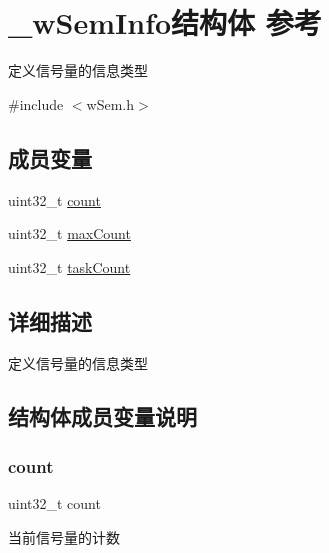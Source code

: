 \hypertarget{struct__w_sem_info}{}\section{\+\_\+w\+Sem\+Info结构体 参考}
\label{struct__w_sem_info}


定义信号量的信息类型  




{\ttfamily \#include $<$w\+Sem.\+h$>$}

\subsection*{成员变量}
\begin{DoxyCompactItemize}
\item 
uint32\+\_\+t \mbox{\hyperlink{struct__w_sem_info_a86988a65e0d3ece7990c032c159786d6}{count}}
\item 
uint32\+\_\+t \mbox{\hyperlink{struct__w_sem_info_a1cc8a4ba5eee24b560f9869012941e91}{max\+Count}}
\item 
uint32\+\_\+t \mbox{\hyperlink{struct__w_sem_info_a80462c64b9184115aa568f08227f7f4a}{task\+Count}}
\end{DoxyCompactItemize}


\subsection{详细描述}
定义信号量的信息类型 

\subsection{结构体成员变量说明}
\mbox{\label{struct__w_sem_info_a86988a65e0d3ece7990c032c159786d6}} 
\subsubsection{\texorpdfstring{count}{count}}
{\footnotesize\ttfamily uint32\+\_\+t count}

当前信号量的计数 \mbox{\label{struct__w_sem_info_a1cc8a4ba5eee24b560f9869012941e91}} 
